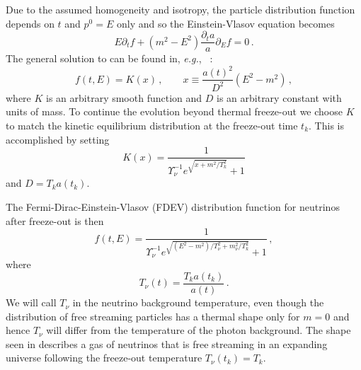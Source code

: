 Due to the assumed homogeneity and isotropy, the particle distribution function depends on $t$ and $p^0=E$ only and so the Einstein-Vlasov equation becomes
\begin{equation}\label{VEeqFLR}
E\partial_tf+(m^2-E^2)\frac{\partial_ta}{a}\partial_{E}f=0\,.
\end{equation}
The general solution to  can be found in, {\it e.g.\/}, ~\cite{Choquet-Bruhat:2009xil,Wong:2011ip}:
\begin{equation}
f(t,E)=K(x)\,,\qquad
x\equiv\frac{a(t)^2}{D^2}(E^2-m^2)\,,
\end{equation}
where $K$ is an arbitrary smooth function and $D$ is an arbitrary constant with units of mass. To continue the evolution beyond thermal freeze-out we choose $K$ to match the kinetic equilibrium distribution  at the freeze-out time $t_k$. This is accomplished by setting
\begin{equation}
K(x)=\frac{1}{\Upsilon_\nu^{-1}e^{\sqrt{x+m^2/T_k^2}}+ 1}
\end{equation}
and $D=T_k a(t_k)$. 

The Fermi-Dirac-Einstein-Vlasov (FDEV) distribution function for neutrinos after freeze-out is then
\begin{equation}\label{eq:NeutrinoDist}
f(t,E)=\frac{1}{\Upsilon_\nu^{-1}e^{\sqrt{(E^2-m^2)/T_\nu^2+m_\nu^2 /T_k^2}}+ 1}\,,
\end{equation}
where 
\begin{equation}\label{eq:TneutrinoDist}
T_\nu(t)=\frac{T_ka(t_k)}{a(t)}\,. 
\end{equation}
We will call $T_\nu$ in  the neutrino background temperature, even though the distribution of free streaming particles has a thermal shape only for $m=0$ and hence $T_{\nu}$ will differ from the temperature of the photon background. The shape seen in   describes a gas of neutrinos that is free streaming in an expanding universe following the freeze-out temperature $T_\nu(t_k)=T_k$. 

